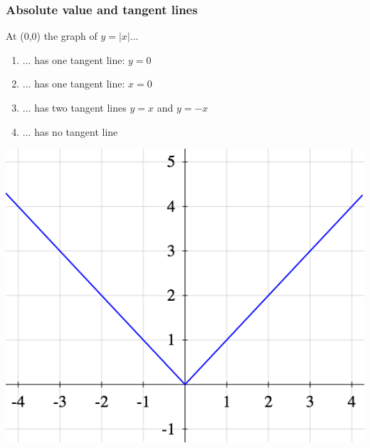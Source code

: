 \documentclass[14pt]{beamer}
\begin{document}
	\begin{frame}[t]
		\frametitle{Absolute value and tangent lines}

		At (0,0) the graph of $\displaystyle y=|x|$...
		\begin{enumerate}
			\item ... has one tangent line: $y=0$

			\item ... has one tangent line: $x=0$

			\item ... has two tangent lines $y=x$ and $y=-x$

			\item ... has no tangent line
		\end{enumerate}

		\begin{center}
			\includegraphics[scale=.25]{G8}
		\end{center}
	\end{frame}

\end{document}
